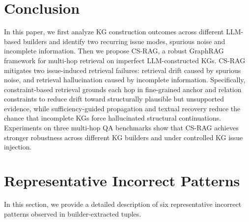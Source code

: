 \documentclass{article}
\theoremstyle{plain}
\theoremstyle{definition}
\theoremstyle{remark}
\begin{document}

\section{Conclusion}

In this paper, we first analyze KG construction outcomes across different LLM-based builders and identify two recurring issue modes, spurious noise and incomplete information. Then we propose CS-RAG, a robust GraphRAG framework for multi-hop retrieval on imperfect LLM-constructed KGs. CS-RAG mitigates two issue-induced retrieval failures: retrieval drift caused by spurious noise, and retrieval hallucination caused by incomplete information. Specifically, constraint-based retrieval grounds each hop in fine-grained anchor and relation constraints to reduce drift toward structurally plausible but unsupported evidence, while sufficiency-guided propagation and textual recovery reduce the chance that incomplete KGs force hallucinated structural continuations. Experiments on three multi-hop QA benchmarks show that CS-RAG achieves stronger robustness across different KG builders and under controlled KG issue injection.





\newpage
\appendix %
\onecolumn

\section{Representative Incorrect Patterns}
\label{app:issue_patterns}

In this section, we provide a detailed description of six representative incorrect patterns observed in builder-extracted tuples.
\end{document}
